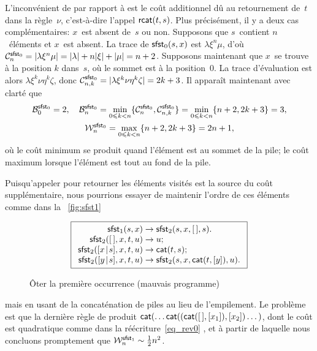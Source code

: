 L'inconvénient de  par rapport à  est le
coût additionnel dû au retournement de~\(t\) dans la règle~\(\nu\),
c'est-à-dire l'appel \(\fun{rcat}(t,s)\). Plus précisément, il y a
deux cas complémentaires: \(x\)~est absent de~\(s\) ou non. Supposons
que \(s\)~contient \(n\)~éléments et \(x\)~est absent. La trace
 de \(\fun{sfst}_0(s,x)\)
est \(\lambda\xi^n\mu\), d'où \(\C{\fun{sfst}_0}{n} =
\len{\lambda\xi^n\mu} = \len{\lambda} + n \len{\xi} + \len{\mu} = n +
2\). Supposons maintenant que \(x\)~se trouve à la position \(k\)
dans~\(s\), où le sommet est à la position~\(0\). La trace
d'évaluation est alors \(\lambda \xi^{k}\nu\eta^k\zeta\), donc
\(\C{\fun{sfst}_0}{n,k} = \len{\lambda \xi^{k}\nu\eta^k\zeta} = 2k +
3\). Il apparaît maintenant avec clarté que
\begin{gather*}
  \B{\fun{sfst}_0}{0} = 2,\quad \B{\fun{sfst}_0}{n} = \min_{0
    \leqslant k < n}\{\C{\fun{sfst}_0}{n}, \C{\fun{sfst}_0}{n,k}\}
                    = \min_{0 \leqslant k < n}\{n+2,2k+3\} = 3,\\
  \W{\fun{sfst}_0}{n} = \max_{0 \leqslant k < n}\{n+2,2k+3\} = 2n+1,
\end{gather*}
où le coût minimum se produit quand l'élément est au sommet de la
pile; le coût maximum lorsque l'élément est tout au fond de la pile.

Puisqu'appeler  pour retourner
les éléments visités est la source du coût supplémentaire, nous
pourrions essayer de maintenir l'ordre de ces éléments comme dans la
\fig~\vref{fig:sfst1}
\begin{figure}
\begin{equation*}
\boxed{%
\begin{array}{r@{\;}l@{\;}l}
\fun{sfst}_1(s,x)               & \rightarrow
                                & \fun{sfst}_2(s,x,\el,s).\\
\fun{sfst}_2(\el,x,t,u)         & \rightarrow & u;\\
\fun{sfst}_2(\cons{x}{s},x,t,u) & \rightarrow & \fun{cat}(t,s);\\
\fun{sfst}_2(\cons{y}{s},x,t,u) & \rightarrow
                                & \fun{sfst}_2(s,x,\fun{cat}(t,[y]),u).
\end{array}}
\end{equation*}
\caption{Ôter la première occurrence (mauvais programme)}
\label{fig:sfst1}
\end{figure}
mais en usant de la concaténation de piles au lieu de l'empilement. Le
problème est que la dernière règle de
 produit
\(\fun{cat}(\dots\fun{cat}((\fun{cat}(\el,[x_1]),[x_2])\dots)\), dont
le coût est quadratique comme dans la
réécriture~\eqref{eq_rev0}
, et à partir de
laquelle nous concluons promptement que \(\W{\fun{sfst}_1}{n} \sim
\tfrac{1}{2}n^2\).

